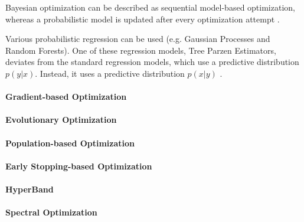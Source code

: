 Bayesian optimization can be described as sequential model-based optimization, whereas a probabilistic model is updated after every optimization attempt \parencite{dewancker}.

Various probabilistic regression can be used (e.g. Gaussian Processes and Random Forests). One of these regression models, Tree Parzen Estimators, deviates from the standard regression models, which use a predictive distribution $p(y|x)$. Instead, it uses a predictive distribution $p(x|y)$ \parencite{NIPS2011_86e8f7ab}.

\paragraph{Gradient-based Optimization}




\paragraph{Evolutionary Optimization}



\paragraph{Population-based Optimization}



\paragraph{Early Stopping-based Optimization}



\paragraph{HyperBand}



\paragraph{Spectral Optimization}

